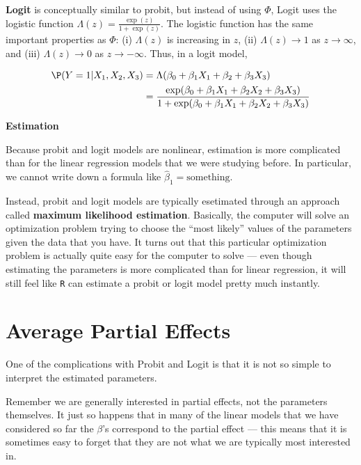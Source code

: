 \documentclass[
  letterpaper,
  DIV=11,
  numbers=noendperiod]{scrreprt}
\begin{document}
\textbf{Logit} is conceptually similar to probit, but instead of using
\(\Phi\), Logit uses the logistic function
\(\Lambda(z) = \frac{\exp(z)}{1+\exp(z)}\). The logistic function has
the same important properties as \(\Phi\): (i) \(\Lambda(z)\) is
increasing in \(z\), (ii) \(\Lambda(z) \rightarrow 1\) as
\(z \rightarrow \infty\), and (iii) \(\Lambda(z) \rightarrow 0\) as
\(z \rightarrow -\infty\). Thus, in a logit model,

\[
  \begin{aligned}
  \P(Y=1 | X_1, X_2, X_3) &= \Lambda(\beta_0 + \beta_1 X_1 + \beta_2 + \beta_3 X_3) \\
  &= \frac{\exp(\beta_0 + \beta_1 X_1 + \beta_2 X_2 + \beta_3 X_3)}{1+\exp(\beta_0 + \beta_1 X_1 + \beta_2 X_2 + \beta_3 X_3)}
  \end{aligned}
\]

\textbf{Estimation}

Because probit and logit models are nonlinear, estimation is more
complicated than for the linear regression models that we were studying
before. In particular, we cannot write down a formula like
\(\hat{\beta}_1 = \textrm{something}\).

Instead, probit and logit models are typically esetimated through an
approach called \textbf{maximum likelihood estimation}. Basically, the
computer will solve an optimization problem trying to choose the ``most
likely'' values of the parameters given the data that you have. It turns
out that this particular optimization problem is actually quite easy for
the computer to solve --- even though estimating the parameters is more
complicated than for linear regression, it will still feel like
\texttt{R} can estimate a probit or logit model pretty much instantly.

\section{Average Partial Effects}\label{average-partial-effects}

One of the complications with Probit and Logit is that it is not so
simple to interpret the estimated parameters.

Remember we are generally interested in partial effects, not the
parameters themselves. It just so happens that in many of the linear
models that we have considered so far the \(\beta\)'s correspond to the
partial effect --- this means that it is sometimes easy to forget that
they are not what we are typically most interested in.
\end{document}
